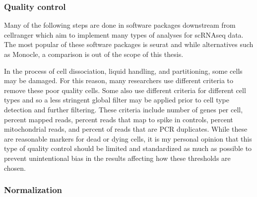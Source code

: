 \subsubsection{Quality control}

\par{
Many of the following steps are done in software packages downstream from cellranger which aim to implement many types of analyses for scRNAseq data. The most popular of these software packages is seurat\cite{seurat1}\cite{seurat2} and while alternatives such as Monocle\cite{monocle}, a comparison is out of the scope of this thesis.
} 

\par{ In the process of cell dissociation, liquid handling, and partitioning, some cells may be damaged. For this reason, many researchers use different criteria to remove these poor quality cells. Some also use different criteria for different cell types and so a less stringent global filter may be applied prior to cell type detection and further filtering. These criteria include number of genes per cell, percent mapped reads, percent reads that map to spike in controls, percent mitochondrial reads, and percent of reads that are PCR duplicates. While these are reasonable markers for dead or dying cells\cite{osorio}\cite{ilicic}, it is my personal opinion that this type of quality control should be limited and standardized as much as possible to prevent unintentional bias in the results affecting how these thresholds are chosen. 
}

\subsubsection{Normalization}\label{section:normalize}

